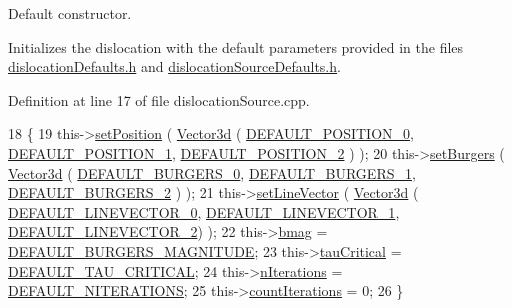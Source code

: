 Default constructor. 

Initializes the dislocation with the default parameters provided in the files \hyperlink{dislocationDefaults_8h}{dislocation\-Defaults.\-h} and \hyperlink{dislocationSourceDefaults_8h}{dislocation\-Source\-Defaults.\-h}. 

Definition at line 17 of file dislocation\-Source.\-cpp.


\begin{DoxyCode}
18 \{
19   this->\hyperlink{classDefect_a2d233d13a8a93f6fba463a1fbc1c6c9f}{setPosition} ( \hyperlink{classVector3d}{Vector3d} ( \hyperlink{dislocationDefaults_8h_a797caa5c52e49fd8d7db6af9bceea257}{DEFAULT\_POSITION\_0}, 
      \hyperlink{dislocationDefaults_8h_a88a33ddda5bafb85a662e09f9cf28e6d}{DEFAULT\_POSITION\_1}, \hyperlink{dislocationDefaults_8h_ad61c6c206e346b3f239c0bba69773eeb}{DEFAULT\_POSITION\_2} ) );
20   this->\hyperlink{classDislocationSource_ae1a26d9f8149206b884436f44e92f4c3}{setBurgers} ( \hyperlink{classVector3d}{Vector3d} ( \hyperlink{dislocationDefaults_8h_a8bc0403713fea52c48652247734ed060}{DEFAULT\_BURGERS\_0}, 
      \hyperlink{dislocationDefaults_8h_a77a5b4d23da175ef84909c513649d6bf}{DEFAULT\_BURGERS\_1}, \hyperlink{dislocationDefaults_8h_a340578d3def7d31536ca2ae4ae444ee1}{DEFAULT\_BURGERS\_2} ) );
21   this->\hyperlink{classDislocationSource_adf7d0b496f5935909daf071a0d733b17}{setLineVector} ( \hyperlink{classVector3d}{Vector3d} ( \hyperlink{dislocationDefaults_8h_a3969abd5a63f951f079c148314416bd2}{DEFAULT\_LINEVECTOR\_0}, 
      \hyperlink{dislocationDefaults_8h_a5d1040038b6cc2afcdf3f935785a118b}{DEFAULT\_LINEVECTOR\_1}, \hyperlink{dislocationDefaults_8h_a517bab607d45c13734cc8450a1062b1d}{DEFAULT\_LINEVECTOR\_2}) );
22   this->\hyperlink{classDislocationSource_a59c95f3cb5af5180d2c42792413f7816}{bmag} = \hyperlink{dislocationDefaults_8h_a48b2523eeb3e024b79124f9f4c50004b}{DEFAULT\_BURGERS\_MAGNITUDE};
23   this->\hyperlink{classDislocationSource_ad91294a3ab5b6f6156a2ad67b9df954e}{tauCritical} = \hyperlink{dislocationSourceDefaults_8h_a685134aa063113b1324cc06492a1995b}{DEFAULT\_TAU\_CRITICAL};
24   this->\hyperlink{classDislocationSource_aacf42c7505f28b50280b23b435024e17}{nIterations} = \hyperlink{dislocationSourceDefaults_8h_ab5c9c41cecc5e0bb1f87710a8c6a9d48}{DEFAULT\_NITERATIONS};
25   this->\hyperlink{classDislocationSource_ac566b877a7c43922077af29bba597a93}{countIterations} = 0;
26 \}
\end{DoxyCode}
